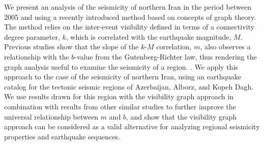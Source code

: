 %
We present an analysis of the seismicity of northern Iran in the period between 2005 and  using a recently introduced method based on concepts of graph theory. The method relies on the inter-event visibility defined in terms of a connectivity degree parameter, $k$, which is correlated with the earthquake magnitude, $M$. Previous studies show that the slope of the $k$-$M$ correlation, $m$, also observes a relationship with the $b$-value from the Gutenberg-Richter law, thus rendering the graph analysis useful to examine the seismicity of a region. . We apply this approach to the case of the seismicity of northern Iran, using an earthquake catalog for the tectonic seismic regions of Azerbaijan, Alborz, and Kopeh Dagh. We use results drawn for this region with the visibility graph approach in combination with results from other similar studies to further improve the universal relationship between $m$ and $b$, and show that the visibility graph approach can be considered as a valid alternative for analyzing regional seismicity properties and earthquake sequences.
